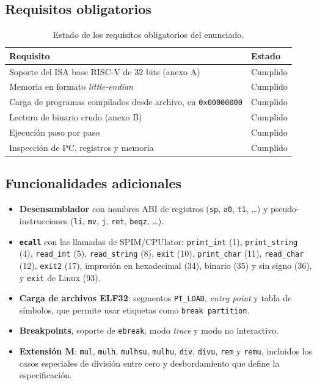 \documentclass[11pt,a4paper]{article}
\begin{document}
\subsection{Requisitos obligatorios}

\begin{table}[h]
  \centering
  \caption{Estado de los requisitos obligatorios del enunciado.}
  \begin{tabularx}{\textwidth}{X l}
    \toprule
    \textbf{Requisito} & \textbf{Estado} \\
    \midrule
    Soporte del ISA base RISC-V de 32 bits (anexo A) & Cumplido \\
    Memoria en formato \textit{little-endian} & Cumplido \\
    Carga de programas compilados desde archivo, en \texttt{0x00000000} & Cumplido \\
    Lectura de binario crudo (anexo B) & Cumplido \\
    Ejecución paso por paso & Cumplido \\
    Inspección de PC, registros y memoria & Cumplido \\
    \bottomrule
  \end{tabularx}
\end{table}

\subsection{Funcionalidades adicionales}

\begin{itemize}
  \item \textbf{Desensamblador} con nombres ABI de registros (\texttt{sp}, \texttt{a0},
    \texttt{t1}, \ldots) y pseudo-instrucciones (\texttt{li}, \texttt{mv}, \texttt{j},
    \texttt{ret}, \texttt{beqz}, \ldots).
  \item \textbf{\texttt{ecall}} con las llamadas de SPIM/CPUlator: \texttt{print\_int} (1),
    \texttt{print\_string} (4), \texttt{read\_int} (5), \texttt{read\_string} (8),
    \texttt{exit} (10), \texttt{print\_char} (11), \texttt{read\_char} (12),
    \texttt{exit2} (17), impresión en hexadecimal (34), binario (35) y sin signo (36), y
    \texttt{exit} de Linux (93).
  \item \textbf{Carga de archivos ELF32}: segmentos \texttt{PT\_LOAD}, \textit{entry point}
    y tabla de símbolos, que permite usar etiquetas como \texttt{break partition}.
  \item \textbf{Breakpoints}, soporte de \texttt{ebreak}, modo \textit{trace} y modo no
    interactivo.
  \item \textbf{Extensión M}: \texttt{mul}, \texttt{mulh}, \texttt{mulhsu}, \texttt{mulhu},
    \texttt{div}, \texttt{divu}, \texttt{rem} y \texttt{remu}, incluidos los casos
    especiales de división entre cero y desbordamiento que define la especificación.
\end{itemize}
\end{document}
